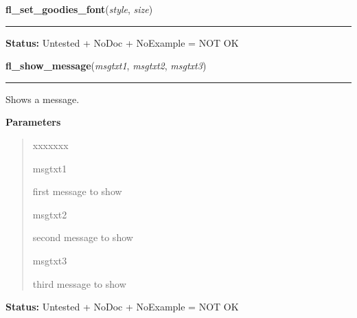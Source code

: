     \label{xformslib:library:fl_set_goodies_font}

    \vspace{0.5ex}

\hspace{.8\funcindent}\begin{boxedminipage}{\funcwidth}

    \raggedright \textbf{fl\_set\_goodies\_font}(\textit{style}, \textit{size})

    \vspace{-1.5ex}

    \rule{\textwidth}{0.5\fboxrule}
\setlength{\parskip}{2ex}
\setlength{\parskip}{1ex}
\textbf{Status:} Untested + NoDoc + NoExample = NOT OK



    \end{boxedminipage}

    \label{xformslib:library:fl_show_message}

    \vspace{0.5ex}

\hspace{.8\funcindent}\begin{boxedminipage}{\funcwidth}

    \raggedright \textbf{fl\_show\_message}(\textit{msgtxt1}, \textit{msgtxt2}, \textit{msgtxt3})

    \vspace{-1.5ex}

    \rule{\textwidth}{0.5\fboxrule}
\setlength{\parskip}{2ex}
    Shows a message.

\setlength{\parskip}{1ex}
      \textbf{Parameters}
      \vspace{-1ex}

      \begin{quote}
        \begin{Ventry}{xxxxxxx}

          \item[msgtxt1]

          first message to show

          \item[msgtxt2]

          second message to show

          \item[msgtxt3]

          third message to show

        \end{Ventry}

      \end{quote}

\textbf{Status:} Untested + NoDoc + NoExample = NOT OK



    \end{boxedminipage}

